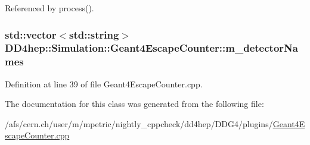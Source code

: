 Referenced by process().\hypertarget{class_d_d4hep_1_1_simulation_1_1_geant4_escape_counter_a64b874d036145e35f7ee6d77cfe11209}{
\subsubsection[{m\_\-detectorNames}]{\setlength{\rightskip}{0pt plus 5cm}std::vector$<$std::string$>$ {\bf DD4hep::Simulation::Geant4EscapeCounter::m\_\-detectorNames}}}
\label{class_d_d4hep_1_1_simulation_1_1_geant4_escape_counter_a64b874d036145e35f7ee6d77cfe11209}


Definition at line 39 of file Geant4EscapeCounter.cpp.

The documentation for this class was generated from the following file:\begin{DoxyCompactItemize}
\item 
/afs/cern.ch/user/m/mpetric/nightly\_\-cppcheck/dd4hep/DDG4/plugins/\hyperlink{_geant4_escape_counter_8cpp}{Geant4EscapeCounter.cpp}\end{DoxyCompactItemize}
